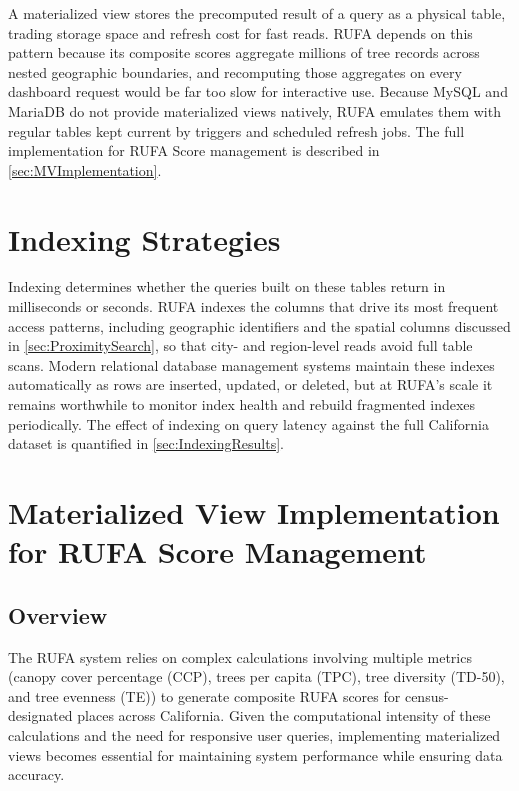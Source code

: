 A materialized view stores the precomputed result of a query as a physical table, trading storage space and refresh cost for fast reads. RUFA depends on this pattern because its composite scores aggregate millions of tree records across nested geographic boundaries, and recomputing those aggregates on every dashboard request would be far too slow for interactive use. Because MySQL and MariaDB do not provide materialized views natively, RUFA emulates them with regular tables kept current by triggers and scheduled refresh jobs. The full implementation for RUFA Score management is described in \autoref{sec:MVImplementation}.

\section{Indexing Strategies}

Indexing determines whether the queries built on these tables return in milliseconds or seconds. RUFA indexes the columns that drive its most frequent access patterns, including geographic identifiers and the spatial columns discussed in \autoref{sec:ProximitySearch}, so that city- and region-level reads avoid full table scans. Modern relational database management systems maintain these indexes automatically as rows are inserted, updated, or deleted, but at RUFA's scale it remains worthwhile to monitor index health and rebuild fragmented indexes periodically. The effect of indexing on query latency against the full California dataset is quantified in \autoref{sec:IndexingResults}.

\section{Materialized View Implementation for RUFA Score Management} \label{sec:MVImplementation}

\subsection{Overview}

The RUFA system relies on complex calculations involving multiple metrics (canopy cover percentage (CCP), trees per capita (TPC), tree diversity (TD-50), and tree evenness (TE)) to generate composite RUFA scores for census-designated places across California. Given the computational intensity of these calculations and the need for responsive user queries, implementing materialized views becomes essential for maintaining system performance while ensuring data accuracy.

